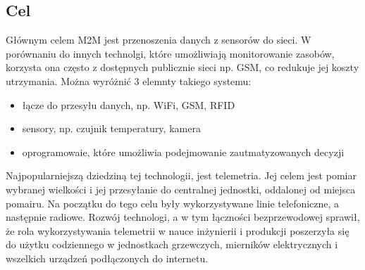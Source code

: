 \documentclass[12pt, a4paper, twoside]{report}
\begin{document}
\subsection{Cel}
\hspace{1cm}Głównym celem M2M jest przenoszenia danych z sensorów do sieci. W porównaniu do innych technolgi, które umożliwiają monitorowanie zasobów, korzysta ona często z dostępnych publicznie sieci np. GSM, co redukuje jej koszty utrzymania. Można wyróżnić 3 elemnty takiego systemu:
\begin{itemize}
  \item łącze do przesyłu danych, np. WiFi, GSM, RFID
  \item sensory, np. czujnik temperatury, kamera
  \item oprogramowaie, które umożliwia podejmowanie zautmatyzowanych decyzji
\end{itemize}
\hspace{1cm}Najpopularniejszą dziedziną tej technologii, jest telemetria. Jej celem jest pomiar wybranej wielkości i jej przesyłanie do centralnej jednostki, oddalonej od miejsca pomairu. Na początku do tego celu były wykorzystywane linie telefoniczne, a następnie radiowe. Rozwój technologi, a w tym łączności bezprzewodowej sprawił, że rola wykorzystywania telemetrii w nauce inżynierii i produkcji poszerzyła się do użytku codziennego w jednostkach grzewczych, mierników elektrycznych i wszelkich urządzeń podłączonych do internetu.\cite{m2m-web}
\end{document}

